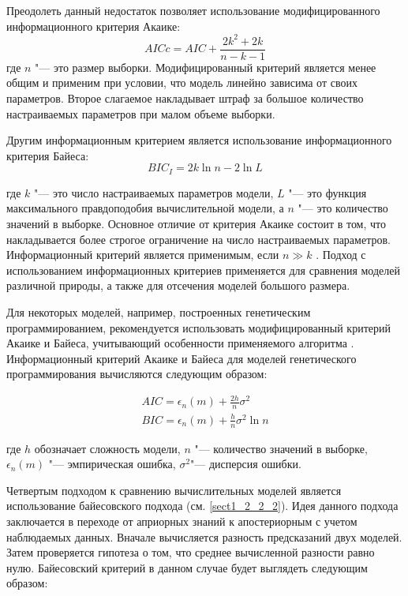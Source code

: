 Преодолеть данный недостаток позволяет использование модифицированного информационного критерия Акаике:  
\begin{equation}
AICc = AIC + \frac{2k^2+2k}{n-k-1}
\end{equation}
где $n$ "--- это размер выборки. Модифицированный критерий является менее общим и применим при условии, что модель 
линейно зависима от своих параметров. Второе слагаемое накладывает штраф за большое количество настраиваемых параметров 
при малом объеме выборки. 

Другим информационным критерием является использование информационного критерия Байеса: 
\begin{equation}
BIC_I= 2k \ln n - 2\ln L
\end{equation}

где $k$ "--- это число настраиваемых параметров модели, $L$ "--- это функция максимального правдоподобия вычислительной 
модели, а $n$ "--- это количество значений в выборке. Основное отличие от критерия Акаике состоит в том, что 
накладывается более строгое ограничение на число настраиваемых параметров. Информационный критерий является 
применимым, если $n \gg k$ \cite{tarasov2017estimation}. Подход с использованием информационных критериев применяется 
для сравнения моделей различной природы, а также для отсечения моделей большого размера.

Для некоторых моделей, например, построенных генетическим программированием, рекомендуется использовать 
модифицированный критерий Акаике и Байеса, учитывающий особенности применяемого алгоритма 
\cite{giraud2021introduction}.  Информационный критерий Акаике и Байеса для моделей генетического программирования 
вычисляются следующим образом:

\begin{equation}
  \begin{array}{l}
AIC=\epsilon_n (m) + \frac{2h}{n} \sigma^2  \\
BIC=\epsilon_n (m) + \frac{h}{n} \sigma^2 \ln n  
  \end{array}
\end{equation}

где $h$ обозначает сложность модели, $n$ "--- количество значений в выборке, $\epsilon_n (m)$ "--- эмпирическая ошибка, 
$\sigma^2$"--- дисперсия ошибки.

Четвертым подходом к сравнению вычислительных моделей является использование байесовского подхода 
(см. \cref{sect1_2_2_2}). Идея данного подхода заключается в переходе от априорных знаний к апостериорным с учетом 
наблюдаемых данных. Вначале вычисляется разность предсказаний двух моделей. Затем проверяется гипотеза о том, что 
среднее вычисленной разности равно нулю. Байесовский критерий в данном случае будет выглядеть следующим образом:

